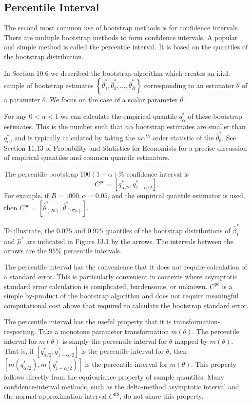 \documentclass[10pt]{article}
\begin{document}
\subsection{Percentile Interval}
The second most common use of bootstrap methods is for confidence intervals. There are multiple bootstrap methods to form confidence intervals. A popular and simple method is called the percentile interval. It is based on the quantiles of the bootstrap distribution.

In Section $10.6$ we described the bootstrap algorithm which creates an i.i.d. sample of bootstrap estimates $\left\{\widehat{\theta}_{1}^{*}, \widehat{\theta}_{2}^{*}, \ldots, \widehat{\theta}_{B}^{*}\right\}$ corresponding to an estimator $\widehat{\theta}$ of a parameter $\theta$. We focus on the case of a scalar parameter $\theta$.

For any $0<\alpha<1$ we can calculate the empirical quantile $q_{\alpha}^{*}$ of these bootstrap estimates. This is the number such that $n \alpha$ bootstrap estimates are smaller than $q_{\alpha}^{*}$, and is typically calculated by taking the $n \alpha^{t h}$ order statistic of the $\widehat{\theta}_{b}^{*}$. See Section $11.13$ of Probability and Statistics for Economists for a precise discussion of empirical quantiles and common quantile estimators.

The percentile bootstrap $100(1-\alpha) \%$ confidence interval is
$$
C^{\mathrm{pc}}=\left[q_{\alpha / 2}^{*}, q_{1-\alpha / 2}^{*}\right] .
$$
For example, if $B=1000, \alpha=0.05$, and the empirical quantile estimator is used, then $C^{\mathrm{pc}}=\left[\widehat{\theta}_{(25)}^{*}, \widehat{\theta}_{(975)}^{*}\right]$.

To illustrate, the $0.025$ and $0.975$ quantiles of the bootstrap distributions of $\widehat{\beta}_{1}^{*}$ and $\widehat{\mu}^{*}$ are indicated in Figure $13.1$ by the arrows. The intervals between the arrows are the $95 \%$ percentile intervals.

The percentile interval has the convenience that it does not require calculation of a standard error. This is particularly convenient in contexts where asymptotic standard error calculation is complicated, burdensome, or unknown. $C^{\mathrm{pc}}$ is a simple by-product of the bootstrap algorithm and does not require meaningful computational cost above that required to calculate the bootstrap standard error.

The percentile interval has the useful property that it is transformation-respecting. Take a monotone parameter transformation $m(\theta)$. The percentile interval for $m(\theta)$ is simply the percentile interval for $\theta$ mapped by $m(\theta)$. That is, if $\left[q_{\alpha / 2}^{*}, q_{1-\alpha / 2}^{*}\right]$ is the percentile interval for $\theta$, then $\left[m\left(q_{\alpha / 2}^{*}\right), m\left(q_{1-\alpha / 2}^{*}\right)\right]$ is the percentile interval for $m(\theta)$. This property follows directly from the equivariance property of sample quantiles. Many confidence-interval methods, such as the delta-method asymptotic interval and the normal-approximation interval $C^{\mathrm{nb}}$, do not share this property.
\end{document}
